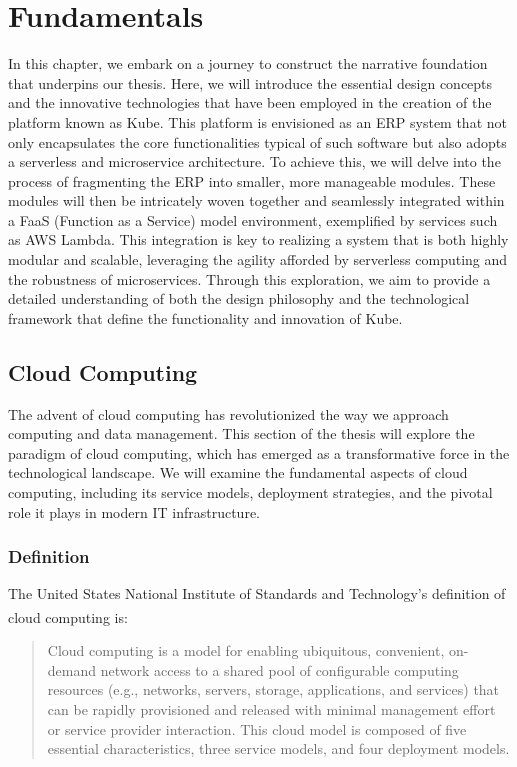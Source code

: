 \chapter{Fundamentals}
In this chapter, we embark on a journey to construct the narrative foundation that underpins our
thesis. Here, we will introduce the essential design concepts and the innovative technologies that
have been employed in the creation of the platform known as Kube. This platform is envisioned as an
ERP system that not only encapsulates the core functionalities typical of such software but also
adopts a serverless and microservice architecture. To achieve this, we will delve into the process
of fragmenting the ERP into smaller, more manageable modules. These modules will then be intricately
woven together and seamlessly integrated within a FaaS (Function as a Service) model environment,
exemplified by services such as AWS Lambda. This integration is key to realizing a system that is
both highly modular and scalable, leveraging the agility afforded by serverless computing and the
robustness of microservices. Through this exploration, we aim to provide a detailed understanding of
both the design philosophy and the technological framework that define the functionality and
innovation of Kube.

\section{Cloud Computing}
The advent of cloud computing has revolutionized the way we approach computing and data management.
This section of the thesis will explore the paradigm of cloud computing, which has emerged as a
transformative force in the technological landscape. We will examine the fundamental aspects of
cloud computing, including its service models, deployment strategies, and the pivotal role it plays
in modern IT infrastructure.

\subsection{Definition}
The United States National Institute of Standards and Technology's definition of cloud computing
is\textsuperscript{\cite{nist}}:

\begin{quote}
    Cloud computing is a model for enabling ubiquitous, convenient, on-demand network access to a
    shared pool of configurable computing resources (e.g., networks, servers, storage, applications, and
    services) that can be rapidly provisioned and released with minimal management effort or service
    provider interaction. This cloud model is composed of five essential characteristics, three service
    models, and four deployment models.
\end{quote}

